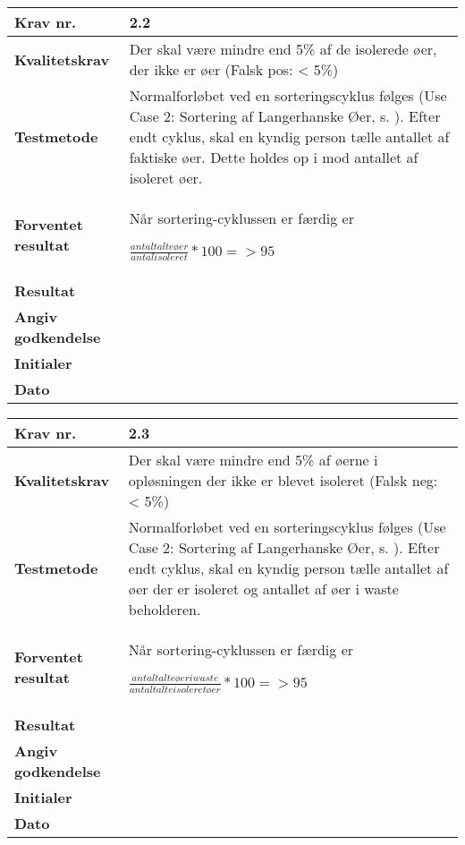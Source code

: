  	\begin{center}
		\begin{longtable}{ | m{4cm}| m{8.5cm}|} 
			\hline
			\textbf{Krav nr.} & 2.2 \\ 
			\hline
			\textbf{Kvalitetskrav} & Der skal være mindre end 5\% af de isolerede øer, der ikke er øer
(Falsk pos: < 5\%) \\
			\hline
			\textbf{Testmetode} & Normalforløbet ved en sorteringscyklus følges (Use Case 2: Sortering af Langerhanske Øer, s.  \pageref{uc:2}). Efter endt cyklus, skal en kyndig person tælle antallet af faktiske øer. Dette holdes op i mod antallet af isoleret øer.  \\
			\hline
			\textbf{Forventet resultat}  & Når sortering-cyklussen er færdig er

$\frac{antal talte øer}{antal isoleret}*100=>95$  \\
			\hline
			\textbf{Resultat}  &    \\
			\hline
			\textbf{Angiv godkendelse} &     \\
			\hline
			\textbf{Initialer} &     \\
			\hline
			\textbf{Dato} &    \\
			\hline
		\end{longtable}
	\end{center}	
			
 	\begin{center}
		\begin{longtable}{ | m{4cm}| m{8.5cm}|} 
			\hline
			\textbf{Krav nr.} & 2.3 \\ 
			\hline
			\textbf{Kvalitetskrav} & Der skal være mindre end 5\% af øerne i opløsningen der ikke er blevet isoleret
(Falsk neg: < 5\%) \\
			\hline
			\textbf{Testmetode} & Normalforløbet ved en sorteringscyklus følges (Use Case 2: Sortering af Langerhanske Øer, s.  \pageref{uc:2}). Efter endt cyklus, skal en kyndig person tælle antallet af øer der er isoleret og antallet af øer i waste beholderen.  \\
			\hline
			\textbf{Forventet resultat}  & Når sortering-cyklussen er færdig er

$\frac{antal talte øer i waste}{antal talte isoleret øer}*100= >95$  \\
			\hline
			\textbf{Resultat}  &    \\
			\hline
			\textbf{Angiv godkendelse} &     \\
			\hline
			\textbf{Initialer} &     \\
			\hline
			\textbf{Dato} &    \\
			\hline
		\end{longtable}
	\end{center}		
			
